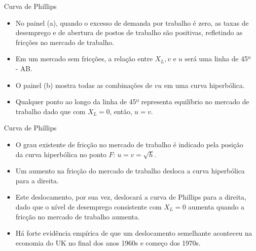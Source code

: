 \documentclass[10pt]{beamer}
\begin{document}
\begin{frame}{Curva de Phillips}
    \begin{itemize}
        \item No painel (a), quando o excesso de demanda por trabalho é zero, as taxas de desemprego e de abertura de postos de trabalho são positivas, refletindo as fricções no mercado de trabalho.
        \bigskip
        \item Em um mercado sem fricções, a relação entre $X_L, v$ e $u$ será uma linha de 45º - AB.
        \bigskip
        \item O painel (b) mostra todas as combinações de $vu$ em uma curva hiperbólica.
        \bigskip
        \item Qualquer ponto ao longo da linha de 45º representa equilíbrio no mercado de trabalho dado que com $X_L = 0$, então, $u = v$.
    \end{itemize}
\end{frame}

\begin{frame}{Curva de Phillips}
    \begin{itemize}
        \item O grau existente de fricção no mercado de trabalho é indicado pela posição da curva hiperbólica no ponto $F$: $u = v = \sqrt{h}$.
        \bigskip
        \item Um aumento na fricção do mercado de trabalho desloca a curva hiperbólica para a direita.
        \bigskip
        \item Este deslocamento, por sua vez, deslocará a curva de Phillips para a direita, dado que o nível de desemprego consistente com $X_L = 0$ aumenta quando a fricção no mercado de trabalho aumenta.
        \bigskip
        \item Há forte evidência empírica de que um deslocamento semelhante aconteceu na economia do UK no final dos anos 1960s e começo dos 1970s.
    \end{itemize}
\end{frame}
\end{document}

